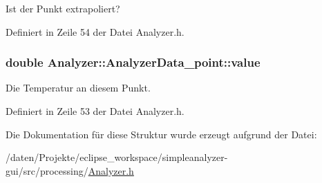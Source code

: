 Ist der Punkt extrapoliert? 



Definiert in Zeile 54 der Datei Analyzer.\-h.

\hypertarget{structAnalyzer_1_1AnalyzerData__point_a150b00a3d0be5d1c75b39292d213cbfa}{
\subsubsection[{value}]{\setlength{\rightskip}{0pt plus 5cm}double Analyzer\-::\-Analyzer\-Data\-\_\-point\-::value}}\label{structAnalyzer_1_1AnalyzerData__point_a150b00a3d0be5d1c75b39292d213cbfa}


Die Temperatur an diesem Punkt. 



Definiert in Zeile 53 der Datei Analyzer.\-h.



Die Dokumentation für diese Struktur wurde erzeugt aufgrund der Datei\-:\begin{DoxyCompactItemize}
\item 
/daten/\-Projekte/eclipse\-\_\-workspace/simpleanalyzer-\/gui/src/processing/\hyperlink{Analyzer_8h}{Analyzer.\-h}\end{DoxyCompactItemize}
